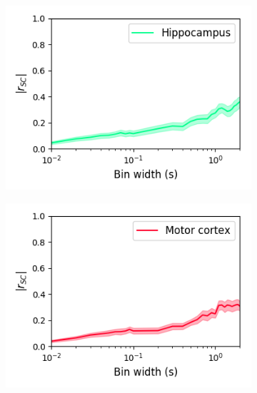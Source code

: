 \documentclass[a4paper,12pt]{article}
\theoremstyle{definition}
\begin{document}
\begin{figure}[p]
  \begin{subfigure}{0.5\textwidth}
    \centering
    \includegraphics[width=\textwidth]{figures/bin_width_correlations_hippocampus_15.png}
  \end{subfigure}
  \begin{subfigure}{0.5\textwidth}
    \centering
    \includegraphics[width=\textwidth]{figures/bin_width_correlations_motor_cortex_15.png}
  \end{subfigure}
  \begin{subfigure}{0.5\textwidth}
    \centering

\end{subfigure}
\end{figure}
\end{document}
